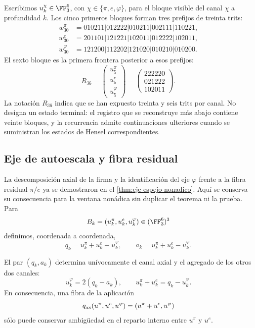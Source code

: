 Escribimos \(u_k^\chi\in\FF_3^6\), con
\(\chi\in\{\pi,e,\varphi\}\), para el bloque visible del canal \(\chi\) a
profundidad \(k\). Los cinco primeros bloques forman tres prefijos de treinta
trits:
\begin{align*}
w_{30}^{\pi}&=010211|012222|010211|002111|110221,\\
w_{30}^{e}&=201101|121221|102011|012222|102011,\\
w_{30}^{\varphi}&=121200|112202|121020|010210|010200.
\end{align*}
El sexto bloque es la primera frontera posterior a esos prefijos:
\[
R_{36}=
\begin{pmatrix}
u_5^\pi\\ u_5^e\\ u_5^\varphi
\end{pmatrix}
=
\begin{pmatrix}
222220\\021222\\102011
\end{pmatrix}.
\]
La notación \(R_{36}\) indica que se han expuesto treinta y seis trits por
canal. No designa un estado terminal: el registro que se reconstruye más abajo
contiene veinte bloques, y la recurrencia admite continuaciones ulteriores
cuando se suministran los estados de Hensel correspondientes.

\subsection{Eje de autoescala y fibra residual}

\ifdefined\HMTAxialTheoremDefined
La descomposición axial de la firma y la identificación del eje
\(\varphi\) frente a la fibra residual \(\pi/e\) ya se demostraron en el
\cref{thm:eje-espejo-nonadico}. Aquí se conserva su consecuencia para la
ventana nonádica sin duplicar el teorema ni la prueba.
\else
Para
\[
B_k=(u_k^\pi,u_k^e,u_k^\varphi)\in(\FF_3^6)^3
\]
definimos, coordenada a coordenada,
\[
q_k=u_k^\pi+u_k^e+u_k^\varphi,
\qquad
a_k=u_k^\pi+u_k^e-u_k^\varphi.
\]

\begin{theorem}
\label{thm:eje-espejo-nonadico}
El par \((q_k,a_k)\) determina unívocamente el canal axial y el agregado de
los otros dos canales:
\[
u_k^\varphi=2(q_k-a_k),
\qquad
u_k^\pi+u_k^e=q_k-u_k^\varphi.
\]
En consecuencia, una fibra de la aplicación
\[
q_{\rm ax}(u^\pi,u^e,u^\varphi)
=(u^\pi+u^e,u^\varphi)
\]
sólo puede conservar ambigüedad en el reparto interno entre \(u^\pi\) y
\(u^e\).
\end{theorem}

